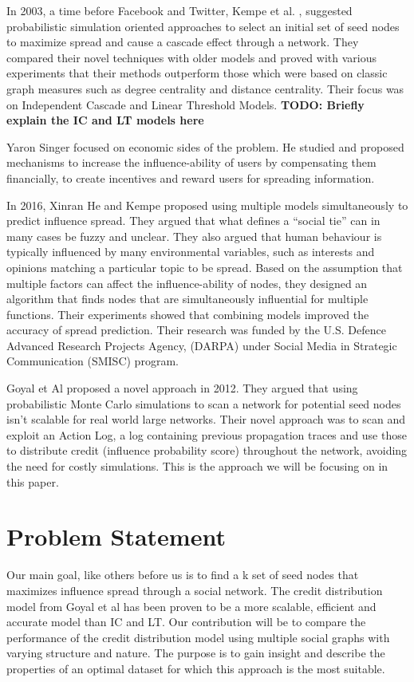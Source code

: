 \documentclass{acm_proc_article-sp}
\begin{document}
In 2003, a time before Facebook and Twitter, Kempe et al. \cite{kempe:maxspread}, suggested probabilistic simulation oriented approaches to select an initial set of seed nodes to maximize spread and cause a cascade effect through a network. They compared their novel techniques with older models and proved with various experiments that their methods outperform those which were based on classic graph measures such as degree centrality and distance centrality. Their focus was on Independent Cascade and Linear Threshold Models.
\textbf{TODO: Briefly explain the IC and LT models here}

Yaron Singer \cite{singer:winfriends} focused on economic sides of the problem. He studied and proposed mechanisms to increase the influence-ability of users by compensating them financially, to create incentives and reward users for spreading information.

In 2016, Xinran He and Kempe \cite{DBLP:journals/corr/HeK16} proposed using multiple models simultaneously to predict influence spread. They argued that what defines a “social tie” can in many cases be fuzzy and unclear. They also argued that human behaviour is typically influenced by many environmental variables, such as interests and opinions matching a particular topic to be spread. Based on the assumption that multiple factors can affect the influence-ability of nodes, they designed an algorithm that finds nodes that are simultaneously influential for multiple functions. Their experiments showed that combining models improved the accuracy of spread prediction. Their research was funded by the U.S. Defence Advanced Research Projects Agency, (DARPA) under Social Media in Strategic Communication (SMISC) program.


Goyal et Al \cite{goyal:datainfluence} proposed a novel approach in 2012. They argued that using probabilistic Monte Carlo simulations to scan a network for potential seed nodes isn't scalable for real world large networks. Their novel approach was to scan and exploit an Action Log, a log containing previous propagation traces and use those to distribute credit (influence probability score) throughout the network, avoiding the need for costly simulations. This is the approach we will be focusing on in this paper.


\section{Problem Statement}

Our main goal, like others before us is to find a k set of seed nodes that maximizes influence spread through a social network. The credit distribution model from Goyal et al has been proven to be a more scalable, efficient and accurate model than IC and LT. Our contribution will be to compare the performance of the credit distribution model using multiple social graphs with varying structure and nature. The purpose is to gain insight and describe the properties of an optimal dataset for which this approach is the most suitable.
\end{document}
